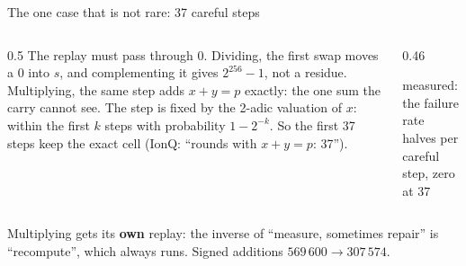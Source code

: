 \documentclass[aspectratio=169,11pt]{beamer}
\begin{document}
\begin{frame}{The one case that is not rare: 37 careful steps}
  \begin{columns}[c]
    \begin{column}{0.5\textwidth}
      \small The replay must pass through $0$. Dividing, the first swap moves a $0$ into $s$, and complementing it gives $2^{256}-1$, not a residue. Multiplying, the same step adds $x+y=p$ exactly: the one sum the carry cannot see.
      \vskip2mm
      The step is fixed by the 2-adic valuation of $x$: within the first $k$ steps with probability $1-2^{-k}$. So the first 37 steps keep the exact cell (IonQ: ``rounds with $x+y=p$: 37'').
    \end{column}
    \begin{column}{0.46\textwidth}
      \centering
      \par
      {\scriptsize measured: the failure rate halves per careful step, zero at 37}
    \end{column}
  \end{columns}
  \vskip2mm
  {\small Multiplying gets its \textbf{own} replay: the inverse of ``measure, sometimes repair'' is ``recompute'', which always runs. Signed additions $569\,600\to307\,574$.}
\end{frame}
\end{document}
